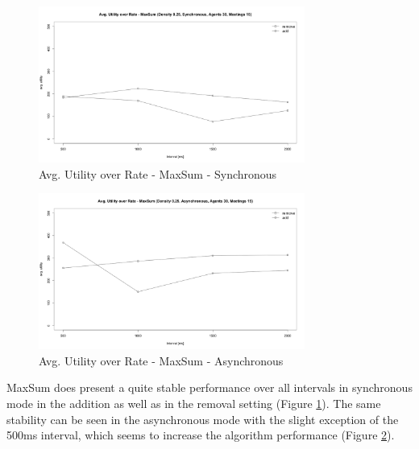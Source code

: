 \begin{figure}[H]
\centering
  \includegraphics[width=330px]{graphics/experiments/dynamic/d_9.png}
  \caption{Avg. Utility over Rate - MaxSum - Synchronous}
  \label{fig:d_9}
\end{figure}
\begin{figure}[H]
\centering
  \includegraphics[width=330px]{graphics/experiments/dynamic/d_10.png}
  \caption{Avg. Utility over Rate - MaxSum - Asynchronous}
  \label{fig:d_10}
\end{figure}

MaxSum does present a quite stable performance over all intervals in synchronous mode in the addition as well as in the removal setting (Figure \ref{fig:d_9}). The same stability can be seen in the asynchronous mode with the slight exception of the 500ms interval, which seems to increase the algorithm performance (Figure \ref{fig:d_10}).




